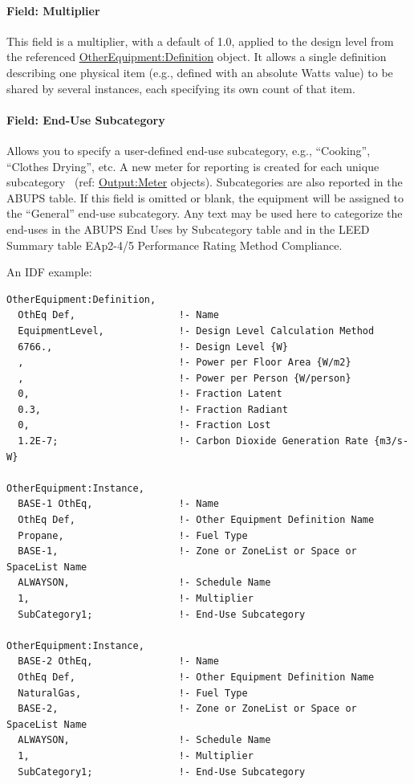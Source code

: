 \paragraph{Field: Multiplier}\label{field-multiplier-otherequipmentinstance}

This field is a multiplier, with a default of 1.0, applied to the design level from the referenced \hyperref[otherequipmentdefinition]{OtherEquipment:Definition} object. It allows a single definition describing one physical item (e.g., defined with an absolute Watts value) to be shared by several instances, each specifying its own count of that item.

\paragraph{Field: End-Use Subcategory}\label{field-end-use-subcategory-otherequip-other-instance}

Allows you to specify a user-defined end-use subcategory, e.g., ``Cooking'', ``Clothes Drying'', etc. A new meter for reporting is created for each unique subcategory~ (ref: \hyperref[outputmeter-and-outputmetermeterfileonly]{Output:Meter} objects). Subcategories are also reported in the ABUPS table. If this field is omitted or blank, the equipment will be assigned to the ``General'' end-use subcategory. Any text may be used here to categorize the end-uses in the ABUPS End Uses by Subcategory table and in the LEED Summary table EAp2-4/5 Performance Rating Method Compliance.

An IDF example:

\begin{lstlisting}
OtherEquipment:Definition,
  OthEq Def,                  !- Name
  EquipmentLevel,             !- Design Level Calculation Method
  6766.,                      !- Design Level {W}
  ,                           !- Power per Floor Area {W/m2}
  ,                           !- Power per Person {W/person}
  0,                          !- Fraction Latent
  0.3,                        !- Fraction Radiant
  0,                          !- Fraction Lost
  1.2E-7;                     !- Carbon Dioxide Generation Rate {m3/s-W}

OtherEquipment:Instance,
  BASE-1 OthEq,               !- Name
  OthEq Def,                  !- Other Equipment Definition Name
  Propane,                    !- Fuel Type
  BASE-1,                     !- Zone or ZoneList or Space or SpaceList Name
  ALWAYSON,                   !- Schedule Name
  1,                          !- Multiplier
  SubCategory1;               !- End-Use Subcategory

OtherEquipment:Instance,
  BASE-2 OthEq,               !- Name
  OthEq Def,                  !- Other Equipment Definition Name
  NaturalGas,                 !- Fuel Type
  BASE-2,                     !- Zone or ZoneList or Space or SpaceList Name
  ALWAYSON,                   !- Schedule Name
  1,                          !- Multiplier
  SubCategory1;               !- End-Use Subcategory
\end{lstlisting}

